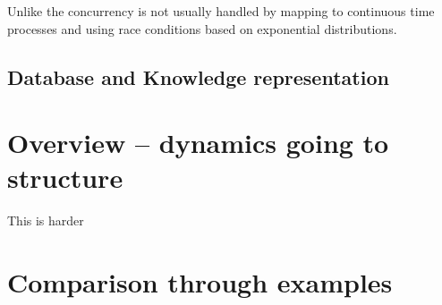 \documentclass[phd]{infthesis}
\begin{document}
Unlike the concurrency is not usually handled by mapping to continuous time
processes and using race conditions based on exponential distributions.

\subsection{Database and Knowledge representation}




\section{Overview -- dynamics going to structure}
This is harder


\section{Comparison through examples}








\singlespace



\printbibliography[heading=bibintoc]

\end{document}
